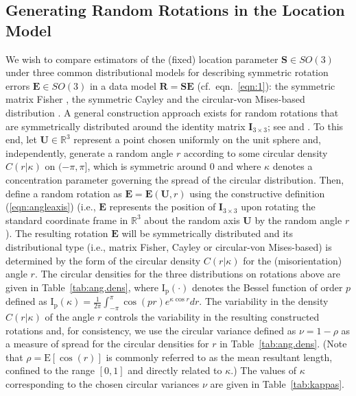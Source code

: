 \subsection{Generating Random Rotations in the Location Model}
\label{subsec:genRR}
We wish to compare estimators of the (fixed) location parameter $\bm{S}\in SO(3)$ under three common distributional models for describing symmetric rotation errors $\bm{E}\in SO(3)$ in a data model  $\bm{R}=\bm{S}\bm{E}$ (cf.~eqn.~\ref{eqn:1}): the symmetric matrix Fisher \citep{langevin05, downs72, khatri77, jupp79}, the symmetric Cayley  \citep{Schaeben97, leon06} and the circular-von Mises-based distribution \citep{bingham09}. A general construction approach exists for random rotations that are symmetrically distributed around the identity matrix $\bm{I}_{3 \times 3}$; see \cite{watson83, bingham09} and \cite{hielscher10}.  To this end, let $\bm{U}\in\mathbb{R}^3$ represent a point chosen uniformly on the unit sphere and, independently, generate a random angle $r$ according to some circular density $C(r|\kappa)$ on $(-\pi,\pi]$, which is symmetric around 0 and where $\kappa$ denotes a concentration parameter governing the spread of the circular distribution.  Then, define a random rotation as $\bm{E}=\bm{E}(\bm{U},r)$ using the constructive definition (\ref{eqn:angleaxis}) (i.e., $\bm{E}$ represents the position of $\bm{I}_{3\times 3}$ upon rotating the standard coordinate frame in $\mathbb{R}^3$ about the random axis $\bm{U}$ by the random angle $r$). The resulting rotation $\bm{E}$ will be symmetrically distributed and its distributional type (i.e., matrix Fisher, Cayley or circular-von Mises-based) is determined by the form of the circular density $C(r|\kappa)$ for the (misorientation) angle $r$. The circular densities  for the three distributions on rotations above are given in Table~\ref{tab:ang.dens}, where $\mathrm{I_p}(\cdot)$ denotes the Bessel function of order $p$ defined as  $\mathrm{I_p}(\kappa)=\frac{1}{2\pi}\int_{-\pi}^{\pi}\cos(pr)e^{\kappa\cos r}dr$.  The variability in the density $C(r|\kappa)$ of the angle $r$ controls the variability in the resulting constructed rotations and, for consistency, we use the circular variance defined as $\nu=1-\rho$ as a measure of spread for the circular densities for $r$ in Table~\ref{tab:ang.dens}.  (Note that $\rho=\mathrm{E}[\cos(r)]$ is commonly referred to as the mean resultant length, confined to the range $[0,1]$ and directly related to $\kappa$.) The values of $\kappa$ corresponding to the chosen circular variances $\nu$ are given in Table~\ref{tab:kappas}.

